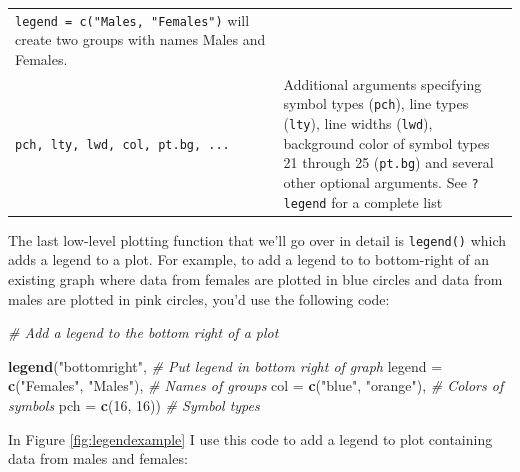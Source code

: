 \documentclass[]{book}
\newenvironment{Shaded}{\begin{snugshade}}{\end{snugshade}}
\newcommand{\KeywordTok}[1]{\textcolor[rgb]{0.13,0.29,0.53}{\textbf{#1}}}
\newcommand{\DataTypeTok}[1]{\textcolor[rgb]{0.13,0.29,0.53}{#1}}
\newcommand{\DecValTok}[1]{\textcolor[rgb]{0.00,0.00,0.81}{#1}}
\newcommand{\StringTok}[1]{\textcolor[rgb]{0.31,0.60,0.02}{#1}}
\newcommand{\CommentTok}[1]{\textcolor[rgb]{0.56,0.35,0.01}{\textit{#1}}}
\newcommand{\NormalTok}[1]{#1}
\theoremstyle{definition}
\theoremstyle{definition}
\theoremstyle{remark}
\begin{document}
\begin{longtable}[]{@{}ll@{}}
\begin{minipage}[t]{0.71\columnwidth}
\texttt{legend\ =\ c("Males,\ "Females")} will create two groups with
names Males and Females.\strut
\end{minipage}\tabularnewline
\begin{minipage}[t]{0.14\columnwidth}\raggedright\strut
\texttt{pch,\ lty,\ lwd,\ col,\ pt.bg,\ ...}\strut
\end{minipage} & \begin{minipage}[t]{0.71\columnwidth}\raggedright\strut
Additional arguments specifying symbol types (\texttt{pch}), line types
(\texttt{lty}), line widths (\texttt{lwd}), background color of symbol
types 21 through 25 (\texttt{pt.bg}) and several other optional
arguments. See \texttt{?legend} for a complete list\strut
\end{minipage}\tabularnewline
\bottomrule
\end{longtable}

The last low-level plotting function that we'll go over in detail is
\texttt{legend()} which adds a legend to a plot. For example, to add a
legend to to bottom-right of an existing graph where data from females
are plotted in blue circles and data from males are plotted in pink
circles, you'd use the following code:

\begin{Shaded}
\begin{Highlighting}[]
\CommentTok{# Add a legend to the bottom right of a plot}

\KeywordTok{legend}\NormalTok{(}\StringTok{"bottomright"}\NormalTok{,                  }\CommentTok{# Put legend in bottom right of graph}
       \DataTypeTok{legend =} \KeywordTok{c}\NormalTok{(}\StringTok{"Females"}\NormalTok{, }\StringTok{"Males"}\NormalTok{), }\CommentTok{# Names of groups}
       \DataTypeTok{col =} \KeywordTok{c}\NormalTok{(}\StringTok{"blue"}\NormalTok{, }\StringTok{"orange"}\NormalTok{),      }\CommentTok{# Colors of symbols}
       \DataTypeTok{pch =} \KeywordTok{c}\NormalTok{(}\DecValTok{16}\NormalTok{, }\DecValTok{16}\NormalTok{))                }\CommentTok{# Symbol types}
\end{Highlighting}
\end{Shaded}

In Figure \ref{fig:legendexample} I use this code to add a legend to
plot containing data from males and females:
\end{document}
